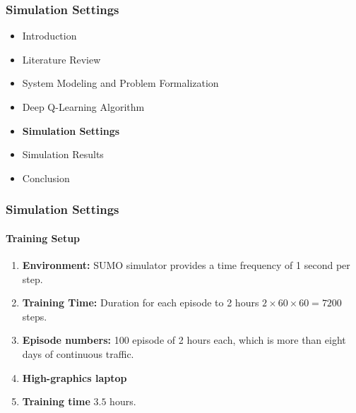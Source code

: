 \documentclass[aspectratio=169]{beamer}
\begin{document}
\begin{frame}
\frametitle{Simulation Settings}
\begin{itemize}
  \item  Introduction
  \item Literature Review
  \item System Modeling and Problem Formalization
  \item Deep Q-Learning Algorithm
  \item {\color{cor1}\textbf{Simulation Settings}}
  \item Simulation Results
  \item Conclusion
\end{itemize}

\end{frame}
\begin{frame}
\frametitle{Simulation Settings}
\framesubtitle{Training Setup}

\begin{enumerate}
    \item \textbf{Environment:} SUMO simulator provides a time frequency of 1 second per step.
    \item  \textbf{Training Time: } Duration for each episode to 2 hours $2\times60\times60=7200$ steps. 
    \item \textbf{Episode numbers:} 100 episode of 2 hours each, which is more than eight days of continuous traffic.
    \item \textbf{High-graphics laptop}
    \item \textbf{Training time} $3.5$ hours.
\end{enumerate}

\end{frame}
\end{document}
